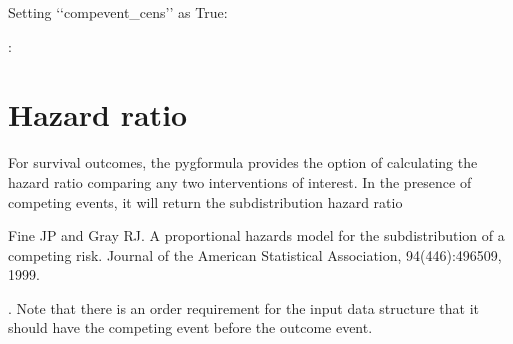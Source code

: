 \documentclass[letterpaper,10pt,english]{sphinxmanual}
\begin{document}
\sphinxAtStartPar
Setting ‘‘compevent\_cens’’ as True:

\begin{sphinxVerbatim}[commandchars=\\\{\}]
  
  
  

            
\end{sphinxVerbatim}

\sphinxAtStartPar
{}:
\begin{quote}

\end{quote}


\section{Hazard ratio}
\label{\detokenize{Specifications/Hazard ratio:hazard-ratio}}\label{\detokenize{Specifications/Hazard ratio:id1}}\label{\detokenize{Specifications/Hazard ratio::doc}}
\sphinxAtStartPar
For survival outcomes, the pygformula provides the option of calculating the hazard ratio comparing any
two interventions of interest. In the presence of competing events, it will return the subdistribution hazard ratio
\sphinxstepexplicit %
\begin{footnote}[1]\label{\thesphinxscope.1}%
\sphinxAtStartFootnote
Fine JP and Gray RJ. A proportional hazards model for the subdistribution of a competing risk. Journal of the American Statistical Association, 94(446):496\textendash{}509, 1999.
%
\end{footnote}. Note that there is an order requirement for the input data structure that it should have the competing event before the outcome event.
\end{document}
